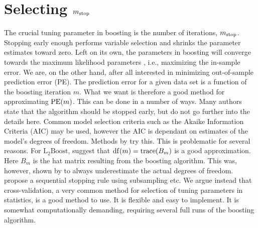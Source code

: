 \section{Selecting $m_{\text{stop}}$}
The crucial tuning parameter in boosting is the number of iterations, $m_{\text{stop}}$. Stopping early enough performs variable selection and shrinks the parameter estimates toward zero. Left on its own, the parameters in boosting will converge towards the maximum likelihood parameters , i.e., maximizing the in-sample error. We are, on the other hand, after all interested in minimizing out-of-sample prediction error (PE). The prediction error for a given data set is a function of the boosting iteration $m$. What we want is therefore a good method for approximating $\operatorname{PE}(m)$. This can be done in a number of ways. Many authors state that the algorithm should be stopped early, but do not go further into the details here. Common model selection criteria such as the Akaike Information Criteria (AIC) may be used, however the AIC is dependant on estimates of the model's degrees of freedom. Methods by \citet{chang2010} try this. This is problematic for several reasons. For $\text{L}_2\text{Boost}$, \citet{buhlmann2007} suggest that $\operatorname{df}(m)=\operatorname{trace}(B_m)$ is a good approximation. Here $B_m$ is the hat matrix resulting from the boosting algorithm. This was, however, shown by \citet{hastie2007} to always underestimate the actual degrees of freedom. \citet{mayr-hofner} propose a sequential stopping rule using subsampling etc. We argue instead that cross-validation, a very common method for selection of tuning parameters in statistics, is a good method to use. It is flexible and easy to implement. It is somewhat computationally demanding, requiring several full runs of the boosting algorithm.

